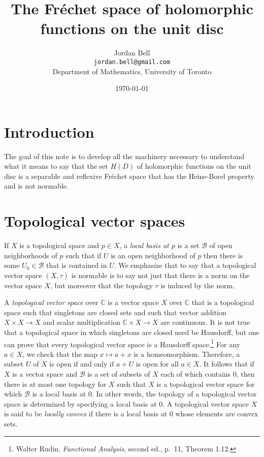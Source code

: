 \documentclass{article}
\begin{document}
\title{The  Fr\'echet space of holomorphic functions on the unit disc}
\author{Jordan Bell\\ \texttt{jordan.bell@gmail.com}\\Department of Mathematics, University of Toronto}
\date{\today}
\maketitle

\section{Introduction}
The goal of this note is to develop all the machinery necessary to understand what it means to say that the set $H(D)$ of holomorphic
functions on the unit disc is a separable and reflexive Fr\'echet space that has the Heine-Borel property and is not normable.



\section{Topological vector spaces}
If $X$ is a topological space and $p \in X$, a {\em local basis at $p$} is a set $\mathscr{B}$ of open neighborhoods of $p$ such that if $U$ is an open neighborhood of 
$p$ then there is some $U_0 \in \mathscr{B}$ that is contained in $U$. 
We emphasize that to say that a topological vector space $(X,\tau)$ is normable is to say not just that there
is a norm on the vector space $X$, but moreover that the topology $\tau$ is induced by the norm.

A {\em topological vector space} over $\mathbb{C}$ is a vector space $X$  over $\mathbb{C}$ that is a  topological space such that singletons are closed sets and such that
vector addition $X \times X \to X$ and scalar multiplication $\mathbb{C} \times X \to X$ are continuous. It is not true that a topological space in which singletons are closed need be
Hausdorff, but one can prove that every topological vector space is a Hausdorff space.\footnote{Walter Rudin, {\em Functional Analysis}, second ed., p.~11, Theorem 1.12.}
For any $a \in X$, we check that the map $x \mapsto a+x$ is a homeomorphism. Therefore, a subset $U$ of $X$ is open if and only if 
$a+U$ is open for all $a \in X$. 
It follows that if $X$ is a vector space and $\mathscr{B}$ is a set of subsets of $X$ each of which contains $0$, then there is at most
one topology for $X$ such that $X$ is a topological vector space for which $\mathscr{B}$ is a local basis at $0$. In other words, the topology of a topological vector space
is determined by specifying a local basis at $0$.
A topological vector space $X$ is said to be {\em locally convex} if there is a local basis at $0$ whose elements are convex sets.
\end{document}
